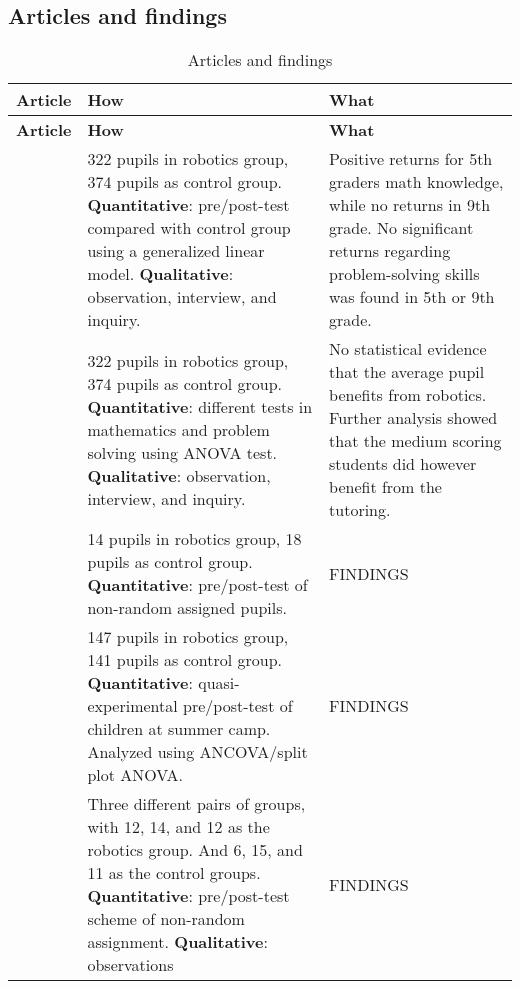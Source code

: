 \subsection*{Articles and findings}
\setlength\LTleft{0px}
\setlength\LTright{0px}
\begin{longtable}{@{\extracolsep{\fill}}p{}p{}@{\hspace{20pt}}p{}}
	\hline \multicolumn{1}{l}{\textbf{Article}} & \multicolumn{1}{l}{\textbf{How}} & \multicolumn{1}{l}{\textbf{What}} \\ \hline\hline
	\endfirsthead
	\hline \multicolumn{1}{l}{\textbf{Article}} & \multicolumn{1}{l}{\textbf{How}} & \multicolumn{1}{l}{\textbf{What}} \\ \hline\hline
	\endhead
	\hline \caption{Articles and findings}\endlastfoot
	\tcite{hussain2006effect} & 322 pupils in robotics group, 374 pupils as control group. \textbf{Quantitative}: pre/post-test compared with control group using a generalized linear model. \textbf{Qualitative}: observation, interview, and inquiry. & Positive returns for 5th graders math knowledge, while no returns in 9th grade. No significant returns regarding problem-solving skills was found in 5th or 9th grade. \\\hline
	
	\tcite{lindh2007does} & 322 pupils in robotics group, 374 pupils as control group. \textbf{Quantitative}: different tests in mathematics and problem solving using ANOVA test. \textbf{Qualitative}: observation, interview, and inquiry. &  No statistical evidence that the average pupil benefits from robotics. Further analysis showed that the medium scoring students did however benefit from the tutoring. \\\hline
	
	\tcite{barker2007robotics} & 14 pupils in robotics group, 18 pupils as control group. \textbf{Quantitative}: pre/post-test of non-random assigned pupils. & FINDINGS \\\hline
	\tcite{nugent2009use} & 147 pupils in robotics group, 141 pupils as control group. \textbf{Quantitative}: quasi-experimental pre/post-test of children at summer camp. Analyzed using ANCOVA/split plot ANOVA. & FINDINGS \\\hline
	
	\tcite{mitnik2008autonomous} & Three different pairs of groups, with 12, 14, and 12 as the robotics group. And 6, 15, and 11 as the control groups. \textbf{Quantitative}: pre/post-test scheme of non-random assignment. \textbf{Qualitative}: observations  & FINDINGS \\\hline
	

\end{longtable}
